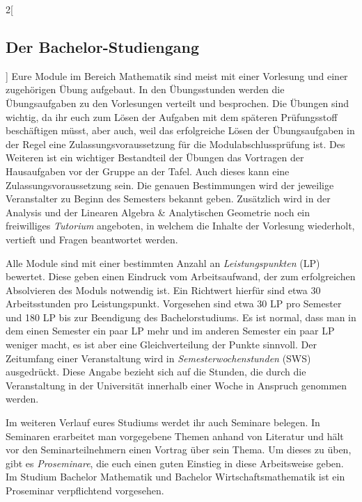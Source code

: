 \begin{multicols}{2}[\subsection{Der Bachelor-Studiengang}]
Eure Module im Bereich Mathematik sind meist mit einer Vorlesung und einer
zugehörigen Übung aufgebaut.  In den Übungsstunden werden die Übungsaufgaben zu
den Vorlesungen verteilt und besprochen.  Die Übungen sind wichtig, da ihr euch
zum Lösen der Aufgaben mit dem späteren Prüfungsstoff beschäftigen müsst, aber
auch, weil das erfolgreiche Lösen der Übungsaufgaben in der Regel eine
Zulassungsvoraussetzung für die Modulabschlussprüfung ist.  Des Weiteren ist
ein wichtiger Bestandteil der Übungen das Vortragen der Hausaufgaben vor der
Gruppe an der Tafel.  Auch dieses kann eine Zulassungsvoraussetzung sein. Die
genauen Bestimmungen wird der jeweilige Veranstalter zu Beginn des Semesters
bekannt geben.  Zusätzlich wird in der Analysis und der Linearen Algebra \&
Analytischen Geometrie noch ein freiwilliges \emph{Tutorium} angeboten, in
welchem die Inhalte der Vorlesung wiederholt, vertieft und Fragen beantwortet
werden.

Alle Module sind mit einer bestimmten Anzahl an \emph{Leistungspunkten} (LP)
bewertet. Diese geben einen Eindruck vom Arbeitsaufwand, der zum erfolgreichen
Absolvieren des Moduls notwendig ist. Ein Richtwert hierfür sind etwa 30
Arbeitsstunden pro Leistungspunkt.  Vorgesehen sind etwa 30 LP pro Semester und
180 LP bis zur Beendigung des Bachelorstudiums.  Es ist normal, dass man in dem
einen Semester ein paar LP mehr und im anderen Semester ein paar LP weniger
macht, es ist aber eine Gleichverteilung der Punkte sinnvoll.  Der Zeitumfang
einer Veranstaltung wird in \emph{Semesterwochenstunden} (SWS) ausgedrückt.
Diese Angabe bezieht sich auf die Stunden, die durch die Veranstaltung in der
Universität innerhalb einer Woche in Anspruch genommen werden.

Im weiteren Verlauf eures Studiums werdet ihr auch Seminare belegen.  In
Seminaren erarbeitet man vorgegebene Themen anhand von Literatur und hält vor
den Seminarteilnehmern einen Vortrag über sein Thema.  Um dieses zu üben, gibt
es \emph{Proseminare}, die euch einen guten Einstieg in diese Arbeitsweise
geben. Im Studium Bachelor Mathematik und Bachelor Wirtschaftsmathematik ist
ein Proseminar verpflichtend vorgesehen. 
\end{multicols}

\clearpage
